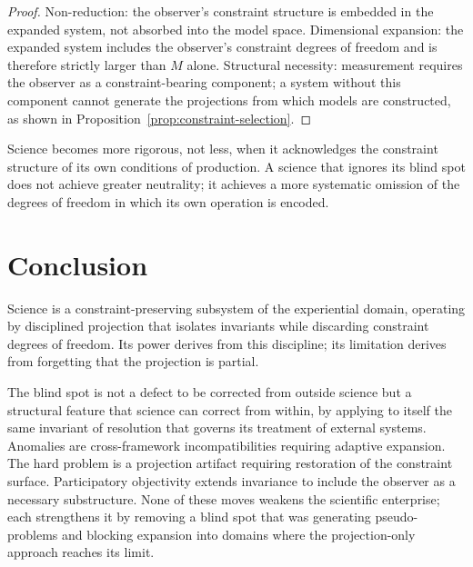 \documentclass[11pt,openany]{book}
\begin{document}
\begin{proof}
Non-reduction: the observer's constraint structure is
embedded in the expanded system, not absorbed into the
model space.  Dimensional expansion: the expanded system
includes the observer's constraint degrees of freedom and
is therefore strictly larger than $M$ alone.  Structural
necessity: measurement requires the observer as a
constraint-bearing component; a system without this
component cannot generate the projections from which models
are constructed, as shown in
Proposition~\ref{prop:constraint-selection}.
\end{proof}

Science becomes more rigorous, not less, when it
acknowledges the constraint structure of its own conditions
of production.  A science that ignores its blind spot does
not achieve greater neutrality; it achieves a more
systematic omission of the degrees of freedom in which its
own operation is encoded.

\section{Conclusion}
\label{sec:conclusion-science}

Science is a constraint-preserving subsystem of the
experiential domain, operating by disciplined projection
that isolates invariants while discarding constraint
degrees of freedom.  Its power derives from this
discipline; its limitation derives from forgetting that the
projection is partial.

The blind spot is not a defect to be corrected from outside
science but a structural feature that science can correct
from within, by applying to itself the same invariant of
resolution that governs its treatment of external systems.
Anomalies are cross-framework incompatibilities requiring
adaptive expansion.  The hard problem is a projection
artifact requiring restoration of the constraint surface.
Participatory objectivity extends invariance to include the
observer as a necessary substructure.  None of these moves
weakens the scientific enterprise; each strengthens it by
removing a blind spot that was generating pseudo-problems
and blocking expansion into domains where the
projection-only approach reaches its limit.

\end{document}
